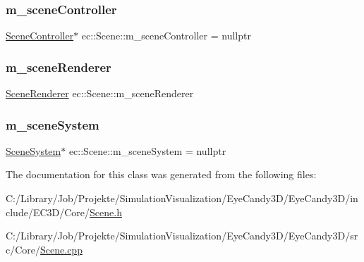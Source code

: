 \mbox{\label{classec_1_1_scene_aa6a8f71066fc44162b1c80341840d5fb}} 
\subsubsection{\texorpdfstring{m\+\_\+scene\+Controller}{m\_sceneController}}
{\footnotesize\ttfamily \mbox{\hyperlink{classec_1_1_scene_controller}{Scene\+Controller}}$\ast$ ec\+::\+Scene\+::m\+\_\+scene\+Controller = nullptr\hspace{0.3cm}{\ttfamily [protected]}}

\mbox{\label{classec_1_1_scene_a17a2c241cec6bda0a5895b353aa28fa7}} 
\subsubsection{\texorpdfstring{m\+\_\+scene\+Renderer}{m\_sceneRenderer}}
{\footnotesize\ttfamily \mbox{\hyperlink{classec_1_1_scene_renderer}{Scene\+Renderer}} ec\+::\+Scene\+::m\+\_\+scene\+Renderer\hspace{0.3cm}{\ttfamily [protected]}}

\mbox{\label{classec_1_1_scene_ad63e472baf8e283c596891384ea98aad}} 
\subsubsection{\texorpdfstring{m\+\_\+scene\+System}{m\_sceneSystem}}
{\footnotesize\ttfamily \mbox{\hyperlink{classec_1_1_scene_system}{Scene\+System}}$\ast$ ec\+::\+Scene\+::m\+\_\+scene\+System = nullptr\hspace{0.3cm}{\ttfamily [protected]}}



The documentation for this class was generated from the following files\+:\begin{DoxyCompactItemize}
\item 
C\+:/\+Library/\+Job/\+Projekte/\+Simulation\+Visualization/\+Eye\+Candy3\+D/\+Eye\+Candy3\+D/include/\+E\+C3\+D/\+Core/\mbox{\hyperlink{_scene_8h}{Scene.\+h}}\item 
C\+:/\+Library/\+Job/\+Projekte/\+Simulation\+Visualization/\+Eye\+Candy3\+D/\+Eye\+Candy3\+D/src/\+Core/\mbox{\hyperlink{_scene_8cpp}{Scene.\+cpp}}\end{DoxyCompactItemize}
